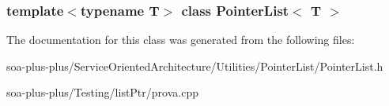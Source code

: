 \subsubsection*{template$<$typename T$>$ class PointerList$<$ T $>$}



The documentation for this class was generated from the following files:\begin{DoxyCompactItemize}
\item 
soa-\/plus-\/plus/ServiceOrientedArchitecture/Utilities/PointerList/PointerList.h\item 
soa-\/plus-\/plus/Testing/listPtr/prova.cpp\end{DoxyCompactItemize}
